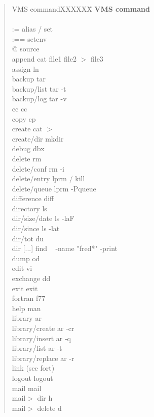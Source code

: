 \begin{quote}
\begin{tabbing}
VMS commandXXXXXX\=\kill
{\bf VMS command} \\
\\
:=		\>alias / set\\
:==		\>setenv\\
@		\>source\\
append          \>cat file1 file2 $>$ file3\\
assign		\>ln\\
backup		\>tar\\
backup/list 	\>tar -t\\
backup/log 	\>tar -v\\
cc		\>cc\\
copy		\>cp\\
create		\>cat $>$\\
create/dir	\>mkdir\\
debug		\>dbx\\
delete		\>rm\\
delete/conf 	\>rm -i\\
delete/entry	\>lprm / kill\\
delete/queue	\>lprm -Pqueue\\
difference	\>diff\\
directory	\>ls\\
dir/size/date	\>ls -laF\\
dir/since	\>ls -lat\\
dir/tot		\>du\\
dir [...]	\>find ~ -name "fred*" -print\\
dump		\>od\\
edit		\>vi\\
exchange	\>dd\\
exit		\>exit\\
fortran		\>f77\\
help		\>man\\
library		\>ar\\
library/create 	\>ar -cr\\
library/insert 	\>ar -q\\
library/list 	\>ar -t\\
library/replace	\>ar -r\\
link		\>(see fort)\\
logout		\>logout\\
mail		\>mail\\
mail$>$ dir     \>h\\
mail$>$ delete	\>d\\

\end{tabbing}
\end{quote}
